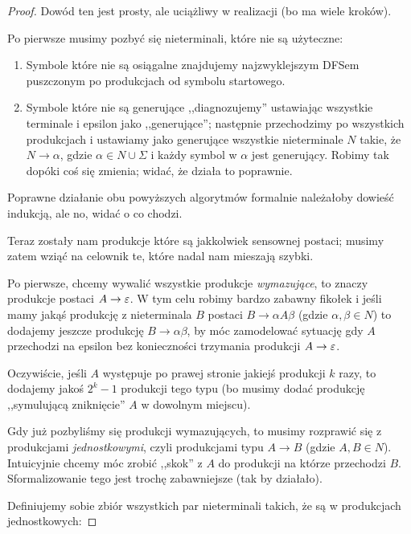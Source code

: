 \begin{proof}
	Dowód ten jest prosty, ale uciążliwy w realizacji (bo ma wiele kroków).

	Po pierwsze musimy pozbyć się nieterminali, które nie są użyteczne:

	\begin{enumerate}
		\item Symbole które nie są osiągalne znajdujemy najzwyklejszym DFSem puszczonym po produkcjach od symbolu startowego.
		\item Symbole które nie są generujące ,,diagnozujemy'' ustawiając wszystkie terminale i epsilon jako ,,generujące''; następnie przechodzimy po wszystkich produkcjach i ustawiamy jako generujące wszystkie nieterminale \(N\) takie, że \( N \rightarrow \alpha \), gdzie \( \alpha \in N \cup \Sigma \) i każdy symbol w \(\alpha\) jest generujący. Robimy tak dopóki coś się zmienia; widać, że działa to poprawnie.
	\end{enumerate}

	Poprawne działanie obu powyższych algorytmów formalnie należałoby dowieść indukcją, ale no, widać o co chodzi.

	Teraz zostały nam produkcje które są jakkolwiek sensownej postaci; musimy zatem wziąć na celownik te, które nadal nam mieszają szybki.

	Po pierwsze, chcemy wywalić wszystkie produkcje \textit{wymazujące}, to znaczy produkcje postaci \( A \rightarrow \varepsilon \). W tym celu robimy bardzo zabawny fikołek i jeśli mamy jakąś produkcję z nieterminala \(B\) postaci \(B \rightarrow \alpha A \beta\) (gdzie \(  \alpha, \beta \in N \)) to dodajemy jeszcze produkcję \(B \rightarrow \alpha \beta\), by móc zamodelować sytuację gdy \(A\) przechodzi na epsilon bez konieczności trzymania produkcji \( A \rightarrow \varepsilon\).

	Oczywiście, jeśli \(A\) występuje po prawej stronie jakiejś produkcji \(k\) razy, to dodajemy jakoś \(2^k-1\) produkcji tego typu (bo musimy dodać produkcję ,,symulującą zniknięcie'' \(A\) w dowolnym miejscu).

	Gdy już pozbyliśmy się produkcji wymazujących, to musimy rozprawić się z produkcjami \textit{jednostkowymi}, czyli produkcjami typu \(A \rightarrow B\) (gdzie \(A, B \in N\)). Intuicyjnie chcemy móc zrobić ,,skok'' z \(A\) do produkcji na którze przechodzi \(B\). Sformalizowanie tego jest trochę zabawniejsze (tak by działało).

	Definiujemy sobie zbiór wszystkich par nieterminali takich, że są w produkcjach jednostkowych:


\end{proof}
